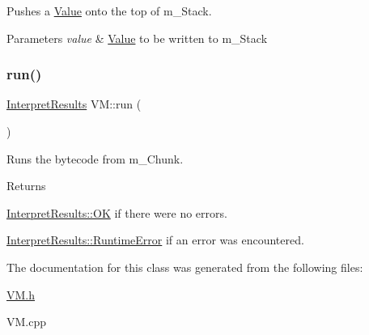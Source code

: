Pushes a \hyperlink{class_value}{Value} onto the top of m\+\_\+\+Stack. 


\begin{DoxyParams}{Parameters}
{\em value} & \hyperlink{class_value}{Value} to be written to m\+\_\+\+Stack \\
\hline
\end{DoxyParams}
\mbox{\label{class_v_m_ab7aa12a22363351fcf724a7a4b2a3d56}} 
\subsubsection{\texorpdfstring{run()}{run()}}
{\footnotesize\ttfamily \hyperlink{_v_m_8h_ae6d9431ba75ad63e3dc378957e0aad8f}{Interpret\+Results} V\+M\+::run (\begin{DoxyParamCaption}{ }\end{DoxyParamCaption})\hspace{0.3cm}{\ttfamily [private]}}



Runs the bytecode from m\+\_\+\+Chunk. 

\begin{DoxyReturn}{Returns}

\begin{DoxyItemize}
\item \hyperlink{_v_m_8h_ae6d9431ba75ad63e3dc378957e0aad8fae0aa021e21dddbd6d8cecec71e9cf564}{Interpret\+Results\+::\+OK} if there were no errors.
\item \hyperlink{_v_m_8h_ae6d9431ba75ad63e3dc378957e0aad8faa334b8fdd25f8fb3e632228494604ee1}{Interpret\+Results\+::\+Runtime\+Error} if an error was encountered. 
\end{DoxyItemize}
\end{DoxyReturn}


The documentation for this class was generated from the following files\+:\begin{DoxyCompactItemize}
\item 
\hyperlink{_v_m_8h}{V\+M.\+h}\item 
V\+M.\+cpp\end{DoxyCompactItemize}
